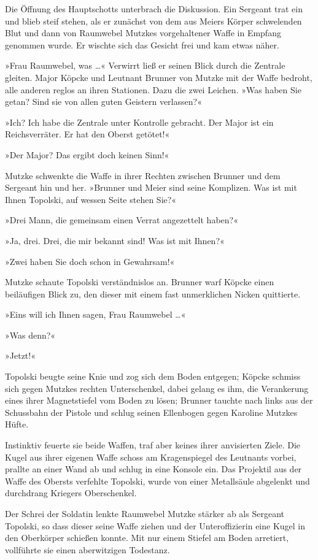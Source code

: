 Die Öffnung des Hauptschotts unterbrach die Diskussion. Ein
Sergeant trat ein und blieb steif stehen, als er zunächst von dem
aus Meiers Körper schwelenden Blut und dann von Raumwebel Mutzkes
vorgehaltener Waffe in Empfang genommen wurde. Er wischte sich das
Gesicht frei und kam etwas näher.

»Frau Raumwebel, was …« Verwirrt ließ er seinen Blick durch die
Zentrale gleiten. Major Köpcke und Leutnant Brunner von Mutzke mit
der Waffe bedroht, alle anderen reglos an ihren Stationen. Dazu die
zwei Leichen. »Was haben Sie getan? Sind sie von allen guten
Geistern verlassen?«

»Ich? Ich habe die Zentrale unter Kontrolle gebracht. Der Major ist
ein Reichsverräter. Er hat den Oberst getötet!«

»Der Major? Das ergibt doch keinen Sinn!«

Mutzke schwenkte die Waffe in ihrer Rechten zwischen Brunner und
dem Sergeant hin und her. »Brunner und Meier sind seine Komplizen.
Was ist mit Ihnen Topolski, auf wessen Seite stehen Sie?«

»Drei Mann, die gemeinsam einen Verrat angezettelt haben?«

»Ja, drei. Drei, die mir bekannt sind! Was ist mit Ihnen?«

»Zwei haben Sie doch schon in Gewahrsam!«

Mutzke schaute Topolski verständnislos an. Brunner warf Köpcke
einen beiläufigen Blick zu, den dieser mit einem fast unmerklichen
Nicken quittierte.

»Eins will ich Ihnen sagen, Frau Raumwebel …«

»Was denn?«

»Jetzt!«

Topolski beugte seine Knie und zog sich dem Boden entgegen; Köpcke
schmiss sich gegen Mutzkes rechten Unterschenkel, dabei gelang es
ihm, die Verankerung eines ihrer Magnetstiefel vom Boden zu lösen;
Brunner tauchte nach links aus der Schussbahn der Pistole und
schlug seinen Ellenbogen gegen Karoline Mutzkes Hüfte.

Instinktiv feuerte sie beide Waffen, traf aber keines ihrer
anvisierten Ziele. Die Kugel aus ihrer eigenen Waffe schoss am
Kragenspiegel des Leutnants vorbei, prallte an einer Wand ab und
schlug in eine Konsole ein. Das Projektil aus der Waffe des Obersts
verfehlte Topolski, wurde von einer Metallsäule abgelenkt und
durchdrang Kriegers Oberschenkel.

Der Schrei der Soldatin lenkte Raumwebel Mutzke stärker ab als
Sergeant Topolski, so dass dieser seine Waffe ziehen und der
Unteroffizierin eine Kugel in den Oberkörper schießen konnte. Mit
nur einem Stiefel am Boden arretiert, vollführte sie einen
aberwitzigen Todestanz.


